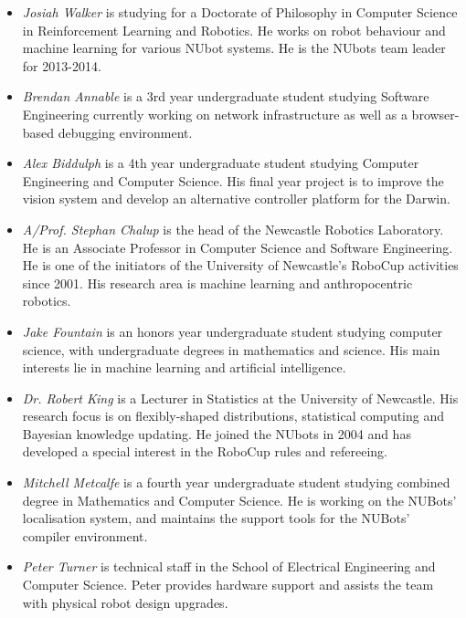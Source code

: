 \documentclass{llncs}
\begin{document}
\begin{itemize}
\item \emph{Josiah Walker} is studying for a Doctorate of Philosophy in Computer Science in Reinforcement Learning and Robotics. He works on robot behaviour and machine learning for various NUbot systems. He is the NUbots team leader for 2013-2014.

\item \emph{Brendan Annable} is a 3rd year undergraduate student studying Software Engineering currently working on network infrastructure as well as a browser-based debugging environment.

\item \emph{Alex Biddulph} is a 4th year undergraduate student studying Computer Engineering and Computer Science. His final year project is to improve the vision system and develop an alternative controller platform for the Darwin.

\item \emph{A/Prof. Stephan Chalup} is the head of the Newcastle Robotics
Laboratory. He is an Associate Professor in Computer Science and Software Engineering.
He is one of the initiators of the University of Newcastle's
RoboCup activities since 2001. His research area is machine learning
and anthropocentric robotics.

\item \emph{Jake Fountain} is an honors year undergraduate student studying computer science, with undergraduate degrees in mathematics and science. His main interests lie in machine learning and artificial intelligence.

\item \emph{Dr. Robert King} is a Lecturer in Statistics at the University of Newcastle. His research focus is on flexibly-shaped distributions,
statistical computing and Bayesian knowledge updating. He joined the
NUbots in 2004 and has developed a special interest in the RoboCup rules and refereeing.

\item \emph{Mitchell Metcalfe} is a fourth year undergraduate student studying combined degree in Mathematics and Computer Science. He is working on the NUBots' localisation system, and maintains the support tools for the NUBots' compiler environment.

\item \emph{Peter Turner} is technical staff in the School of Electrical Engineering and Computer Science. Peter provides hardware support and assists the team with physical robot design upgrades. %


\end{itemize}
\end{document}
